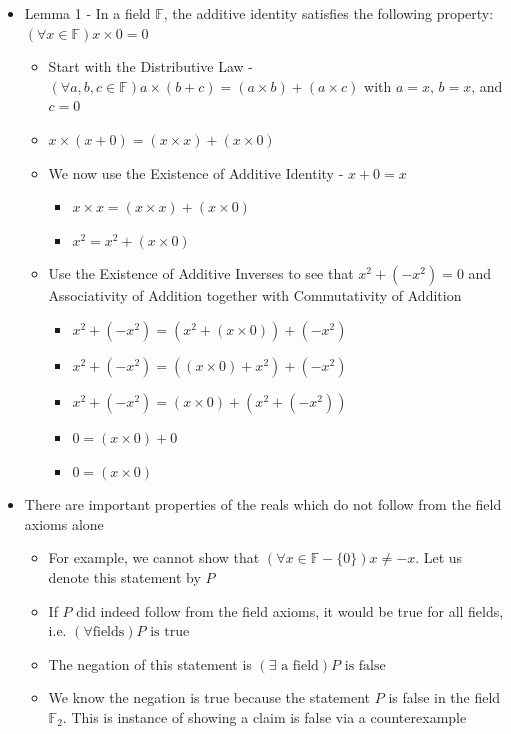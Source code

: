\documentclass{article}
\begin{document}
\begin{itemize}
\begin{itemize}
    \end{itemize}
    \item Lemma 1 - In a field $\mathbb{F}$, the additive identity satisfies the following property: $(\forall x \in \mathbb{F})x \times 0 = 0$
    \begin{itemize}
        \item Start with the Distributive Law - $(\forall a,b,c \in \mathbb{F})a \times (b+c)=(a \times b) + (a \times c)$ with $a=x$, $b=x$, and $c=0$
        \item $x \times (x+0)=(x \times x) + (x \times 0)$
        \item We now use the Existence of Additive Identity - $x+0=x$
        \begin{itemize}
            \item $x \times x = (x \times x) + (x \times 0)$
            \item $x^2 = x^2 + (x \times 0)$
        \end{itemize}
        \item Use the Existence of Additive Inverses to see that $x^2+(-x^2)=0$ and Associativity of Addition together with Commutativity of Addition
        \begin{itemize}
            \item $x^2 + (-x^2) = (x^2 + (x \times 0)) + (-x^2)$
            \item $x^2 + (-x^2) = 
            ((x \times 0) + x^2) + (-x^2)$
            \item $x^2 + (-x^2) = (x \times 0) + (x^2 + (-x^2))$
            \item $0 = (x \times 0) + 0$
            \item $0 = (x \times 0)$
        \end{itemize}
    \end{itemize}
    \item There are important properties of the reals which do not follow from the field axioms alone
    \begin{itemize}
        \item For example, we cannot show that $(\forall x \in \mathbb{F} - \{0\})x \neq -x$. Let us denote this statement by $P$
        \item If $P$ did indeed follow from the field axioms, it would be true for all fields, i.e. $(\forall \text{fields}) P \text{ is true}$
        \item The negation of this statement is $(\exists \text{ a field}) P \text{ is false}$
        \item We know the negation is true because the statement $P$ is false in the field $\mathbb{F}_2$. This is instance of showing a claim is false via a counterexample
    \end{itemize}
\end{itemize}
\end{document}
